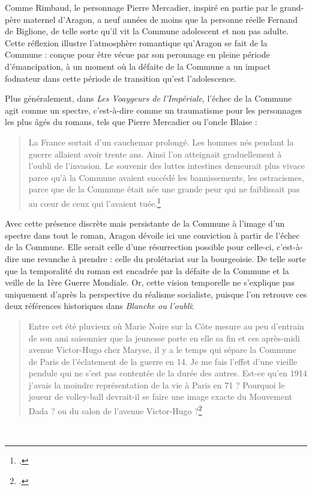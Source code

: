  Comme Rimbaud, le personnage Pierre Mercadier, inspiré en partie par le grand-père maternel d'Aragon, a neuf années de moins que la personne réelle Fernand de Biglione, de telle sorte qu'il vit la Commune adolescent et non pas adulte. Cette réflexion illustre l'atmosphère romantique qu'Aragon se fait de la Commune : conçue pour être vécue par son peronnage en pleine période d'émancipation, à un moment où la défaite de la Commune a un impact fodnateur dans cette période de transition qu'est l'adolescence. 

 Plus généralement, dans \emph{Les Voaygeurs de l'Impériale}, l'échec de la Commune agit comme un spectre, c'est-à-dire comme un traumatisme pour les personnages les plus âgés du romans, tels que Pierre Mercadier ou l'oncle Blaise :

 \begin{quote}
 La France sortait d’un cauchemar prolongé. Les hommes nés pendant la guerre allaient avoir trente ans. Ainsi l’on atteignait graduellement à l’oubli de l’invasion. Le souvenir des luttes intestines demeurait plus vivace parce qu’à la Commune avaient succédé les bannissements, les ostracismes, parce que de la Commune était née une grande peur qui ne faiblissait pas au c\oe{}ur de  ceux qui l’avaient tuée.\footcite[p459]{voyageursdelimperiale}\end{quote}

 Avec cette présence discrète mais persistante de la Commune à l'image d'un spectre dans tout le roman, Aragon dévoile ici une conviction à partir de l'échec de la Commune. Elle serait celle d'une résurrection possible pour celle-ci, c'est-à-dire une revanche à prendre : celle du prolétariat sur la bourgeoisie. De telle sorte que la temporalité du roman est encadrée par la défaite de la Commune et la veille de la 1ère Guerre Mondiale. Or, cette vision temporelle ne s'explique pas uniquement d'après la perspective du réalisme socialiste, puisque l'on retrouve ces deux références historiques dans \emph{Blanche ou l'oubli}:

 \begin{quote}
Entre cet été pluvieux où Marie Noire sur la Côte mesure au peu d’entrain de son ami saisonnier que la jeunesse porte en elle sa fin et ces après-midi avenue Victor-Hugo chez Maryse, il y a le temps qui sépare la Commune de Paris de l’éclatement de la guerre en 14. Je me fais l’effet d’une vieille pendule qui ne s’est pas contentée de la durée des autres. Est-ce qu’en 1914 j’avais la moindre représentation de la vie à Paris en 71 ? Pourquoi le joueur de volley-ball devrait-il se faire une image exacte du Mouvement Dada ? ou du salon de l’avenue Victor-Hugo ?\footcite[p38]{blancheouloubli}\end{quote} 

